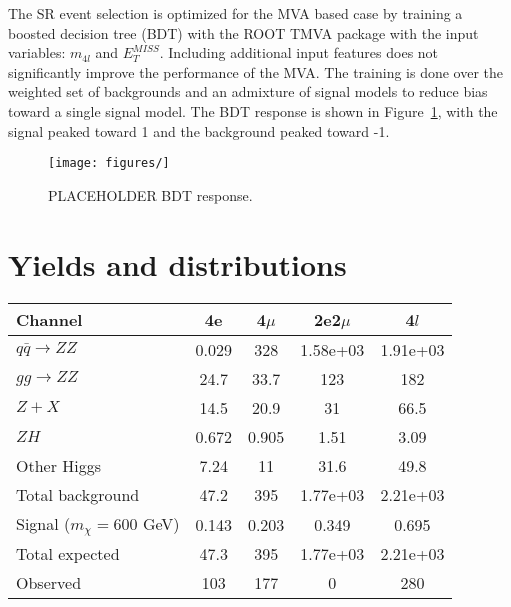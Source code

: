 The SR event selection is optimized for the MVA based case by training a boosted decision tree (BDT) with the ROOT TMVA package with the input variables: $m_{4l}$ and $E_T^{MISS}$. Including additional input features does not significantly improve the performance of the MVA. The training is done over the weighted set of backgrounds and an admixture of signal models to reduce bias toward a single signal model. The BDT response is shown in Figure~\ref{fig:bdt}, with the signal peaked toward 1 and the background peaked toward -1. 

\begin{figure}[tbh]
\centering
\texttt{[image: figures/]}
\caption{PLACEHOLDER BDT response.}
\label{fig:bdt}
\end{figure}


\section{Yields and distributions}

\begin{table*}[htbH]
\begin{center}
\label{tab:yields}
\begin{tabular}{ l | c | c | c | c}
\hline
\hline
Channel & 4e & 4$\mu$ & 2e2$\mu$ & 4$l$ \\
\hline
$q\bar{q} \rightarrow ZZ$ & 0.029 & 328 & 1.58e+03 & 1.91e+03 \\
$gg \rightarrow ZZ$ & 24.7 & 33.7 & 123 & 182 \\
$Z+X$ & 14.5 & 20.9 & 31 & 66.5 \\
$ZH$ & 0.672 & 0.905 & 1.51 & 3.09 \\
Other Higgs & 7.24 & 11 & 31.6 & 49.8 \\
\hline
Total background & 47.2 & 395 & 1.77e+03 & 2.21e+03 \\
\hline
Signal ($m_\chi=600$ GeV) & 0.143 & 0.203 & 0.349 & 0.695 \\
\hline
Total expected & 47.3 & 395 & 1.77e+03 & 2.21e+03 \\
\hline
Observed & 103 & 177 & 0 & 280 \\
\hline
\hline
\end{tabular}
\end{center}
\end{table*}

